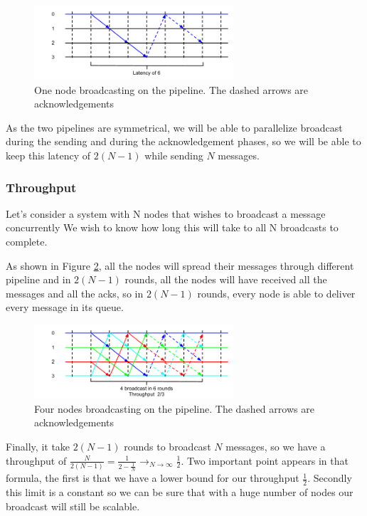 \documentclass[a4paper]{article}
\begin{document}
\begin{figure}[h]
    \centering
    \includegraphics[width=280px]{Latency2.png}
    \caption{One node broadcasting on the pipeline. The dashed arrows are
    acknowledgements}
    \label{figure:latency2}
\end{figure}

As the two pipelines are symmetrical, we will be able to parallelize broadcast
during the sending and during the acknowledgement phases, so we will be able to
keep this latency of $2(N-1)$ while sending $N$ messages.
\subsubsection{Throughput}
Let’s consider a system with N nodes that wishes to broadcast a message concurrently
We wish to know how long this will take to all N broadcasts to
complete.

As shown in Figure \ref{figure:throughput2}, all the nodes will spread their
messages through different pipeline and in $2(N-1)$ rounds, all the
nodes will have received all the messages and all the acks, so in $2(N-1)$ rounds,
every node is able to deliver every message in its queue.

\begin{figure}[h]
    \centering
    \includegraphics[width=280px]{Throughput2.png}
    \caption{Four nodes broadcasting on the pipeline. The dashed arrows are
    acknowledgements}
    \label{figure:throughput2}
\end{figure}

Finally, it take $2(N-1)$ rounds to broadcast $N$ messages, so we have a throughput
of $\frac{N}{2(N-1)}=\frac{1}{2-\frac{1}{N}}\longrightarrow_{N \rightarrow
\infty}\frac{1}{2}$. Two important point appears in that formula, the first is
that we have a lower bound for our throughput $\frac{1}{2}$. Secondly this limit 
is a constant so we can be sure that with a huge number of nodes our broadcast
will still be scalable.
\end{document}
